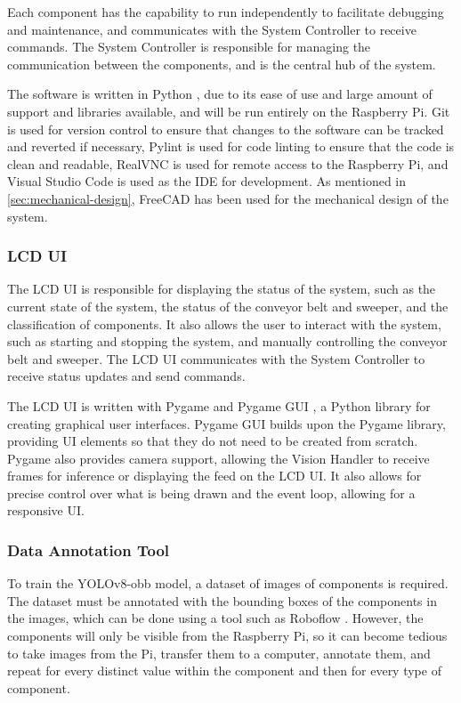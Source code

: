Each component has the capability to run independently to facilitate debugging and maintenance, and communicates with the System Controller to receive commands. The System Controller is responsible for managing the communication between the components, and is the central hub of the system.

The software is written in Python \cite{python}, due to its ease of use and large amount of support and libraries available, and will be run entirely on the Raspberry Pi. Git \cite{git} is used for version control to ensure that changes to the software can be tracked and reverted if necessary, Pylint \cite{pylint} is used for code linting to ensure that the code is clean and readable, RealVNC \cite{realvnc} is used for remote access to the Raspberry Pi, and Visual Studio Code \cite{vscode} is used as the IDE for development. As mentioned in \autoref{sec:mechanical-design}, FreeCAD \cite{freecad} has been used for the mechanical design of the system.

\subsubsection{LCD UI}
The LCD UI is responsible for displaying the status of the system, such as the current state of the system, the status of the conveyor belt and sweeper, and the classification of components. It also allows the user to interact with the system, such as starting and stopping the system, and manually controlling the conveyor belt and sweeper. The LCD UI communicates with the System Controller to receive status updates and send commands.

The LCD UI is written with Pygame \cite{pygamedoc} and Pygame GUI \cite{pygamegui}, a Python library for creating graphical user interfaces. Pygame GUI builds upon the Pygame library, providing UI elements so that they do not need to be created from scratch. Pygame also provides camera support, allowing the Vision Handler to receive frames for inference or displaying the feed on the LCD UI. It also allows for precise control over what is being drawn and the event loop, allowing for a responsive UI.

\subsubsection{Data Annotation Tool}
\label{sec:data-annotation-tool}
To train the YOLOv8-obb model, a dataset of images of components is required. The dataset must be annotated with the bounding boxes of the components in the images, which can be done using a tool such as Roboflow \cite{roboflow}. However, the components will only be visible from the Raspberry Pi, so it can become tedious to take images from the Pi, transfer them to a computer, annotate them, and repeat for every distinct value within the component and then for every type of component.

